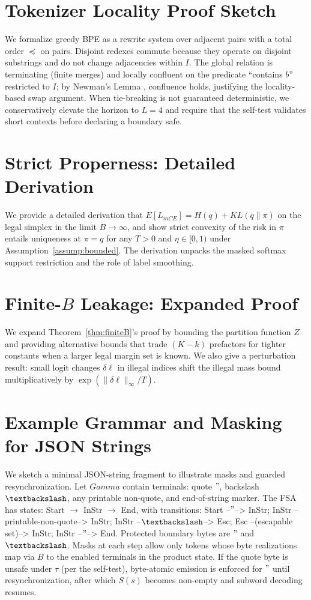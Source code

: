 \documentclass{article}
\def\Gamma{Gamma}%
\def\mathcal#1{#1}%
\def\mathrm#1{#1}%
\def\mathbb#1{#1}%
\begin{document}
\section{Tokenizer Locality Proof Sketch}\label{app:locality}
We formalize greedy BPE as a rewrite system over adjacent pairs with a total order $\preceq$ on pairs. Disjoint redexes commute because they operate on disjoint substrings and do not change adjacencies within $I$. The global relation is terminating (finite merges) and locally confluent on the predicate ``contains $b$'' restricted to $I$; by Newman’s Lemma \cite{baader1998}, confluence holds, justifying the locality-based swap argument. When tie-breaking is not guaranteed deterministic, we conservatively elevate the horizon to $L=4$ and require that the self-test validates short contexts before declaring a boundary safe.

\section{Strict Properness: Detailed Derivation}\label{app:proper}
We provide a detailed derivation that $\mathbb{E}[\mathcal{L}_{\mathrm{mCE}}]=H(q)+\mathrm{KL}(q\|\pi)$ on the legal simplex in the limit $B\to\infty$, and show strict convexity of the risk in $\pi$ entails uniqueness at $\pi=q$ for any $T>0$ and $\eta\in[0,1)$ under Assumption~\ref{assump:bounded}. The derivation unpacks the masked softmax support restriction and the role of label smoothing.

\section{Finite-$B$ Leakage: Expanded Proof}\label{app:finiteB}
We expand Theorem~\ref{thm:finiteB}'s proof by bounding the partition function $Z$ and providing alternative bounds that trade $(K{-}k)$ prefactors for tighter constants when a larger legal margin set is known. We also give a perturbation result: small logit changes $\delta \ell$ in illegal indices shift the illegal mass bound multiplicatively by $\exp(\|\delta \ell\|_\infty/T)$.

\section{Example Grammar and Masking for JSON Strings}\label{app:json}
We sketch a minimal JSON-string fragment to illustrate masks and guarded resynchronization. Let $\Gamma$ contain terminals: quote $\mathtt{"}$, backslash $\mathtt{\textbackslash}$, any printable non-quote, and end-of-string marker. The FSA has states: Start $\to$ InStr $\to$ End, with transitions: Start --$\mathtt{"}$--> InStr; InStr --printable-non-quote--> InStr; InStr --$\mathtt{\textbackslash}$--> Esc; Esc --(escapable set)--> InStr; InStr --$\mathtt{"}$--> End. Protected boundary bytes are $\mathtt{"}$ and $\mathtt{\textbackslash}$. Masks at each step allow only tokens whose byte realizations map via $\mathcal{B}$ to the enabled terminals in the product state. If the quote byte is unsafe under $\tau$ (per the self-test), byte-atomic emission is enforced for $\mathtt{"}$ until resynchronization, after which $\mathcal{S}(s)$ becomes non-empty and subword decoding resumes.
\end{document}
